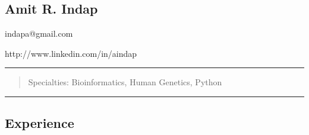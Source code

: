 \documentclass[]{article}
\author{}
\date{}
\begin{document}
\begin{center}
\section{Amit R. Indap}\label{amit-r.-indap}
indapa@gmail.com

 http://www.linkedin.com/in/aindap
\end{center}

\begin{center}\rule{3in}{0.4pt}\end{center}

\begin{quote}
\begin{center}
Specialties: Bioinformatics, Human Genetics, Python
\end{center}
\end{quote}

\begin{center}\rule{3in}{0.4pt}\end{center}

\subsection{Experience}\label{experience}
\end{document}
